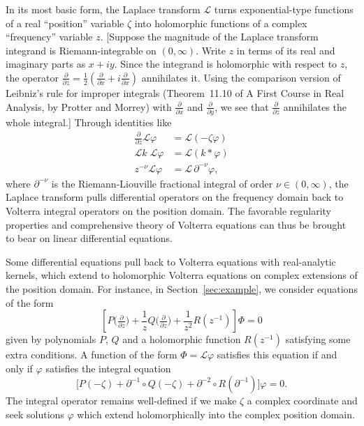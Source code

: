 \documentclass[review]{siamart220329}
\newcommand{\laplace}{\mathcal{L}}
\newenvironment{verify}{\color{veriforest}}{\color{black}}
\begin{document}
In its most basic form, the Laplace transform $\laplace$ turns exponential-type functions of a real ``position'' variable $\zeta$ into holomorphic functions of a complex ``frequency'' variable $z$. \begin{verify}[Suppose the magnitude of the Laplace transform integrand is Riemann-integrable on $(0, \infty)$. Write $z$ in terms of its real and imaginary parts as $x + iy$. Since the integrand is holomorphic with respect to $z$, the operator $\frac{\partial}{\partial\overline{z}} = \frac{1}{2}\left(\frac{\partial}{\partial x} + i\frac{\partial}{\partial x}\right)$ annihilates it. Using the comparison version of Leibniz's rule for improper integrals (Theorem~11.10 of A First Course in Real Analysis, by Protter and Morrey) with $\frac{\partial}{\partial x}$ and $\frac{\partial}{\partial y}$, we see that $\frac{\partial}{\partial\overline{z}}$ annihilates the whole integral.]\end{verify} Through identities like
\begin{align*}
\frac{\partial}{\partial z} \laplace \varphi & = \laplace(-\zeta\varphi) \\
\laplace k\;\laplace \varphi & = \laplace(k * \varphi) \\
z^{-\nu} \laplace \varphi & = \laplace\,\partial^{-\nu} \varphi,
\end{align*}
where $\partial^{-\nu}$ is the Riemann-Liouville fractional integral of order $\nu \in (0, \infty)$, the Laplace transform pulls differential operators on the frequency domain back to Volterra integral operators on the position domain. The favorable regularity properties and comprehensive theory of Volterra equations can thus be brought to bear on linear differential equations.

Some differential equations pull back to Volterra equations with real-analytic kernels, which extend to holomorphic Volterra equations on complex extensions of the position domain. For instance, in Section~\ref{sec:example}, we consider equations of the form
\begin{equation}\label{eqn:intro-level-1}
\left[ P\big(\tfrac{\partial}{\partial z}\big) + \frac{1}{z} Q\big(\tfrac{\partial}{\partial z}\big) + \frac{1}{z^2} R(z^{-1}) \right] \Phi = 0
\end{equation}
given by polynomials $P$, $Q$ and a holomorphic function $R(z^{-1})$ satisfying some extra conditions. A function of the form $\Phi = \laplace \varphi$ satisfies this equation if and only if $\varphi$ satisfies the integral equation
\begin{equation}\label{eqn:intro-use-dict}
\big[ P(-\zeta)+\partial^{-1}\circ Q(-\zeta)+\partial^{-2}\circ R(\partial^{-1}) \big] \varphi = 0.
\end{equation}
The integral operator remains well-defined if we make $\zeta$ a complex coordinate and seek solutions $\varphi$ which extend holomorphically into the complex position domain.
\end{document}
